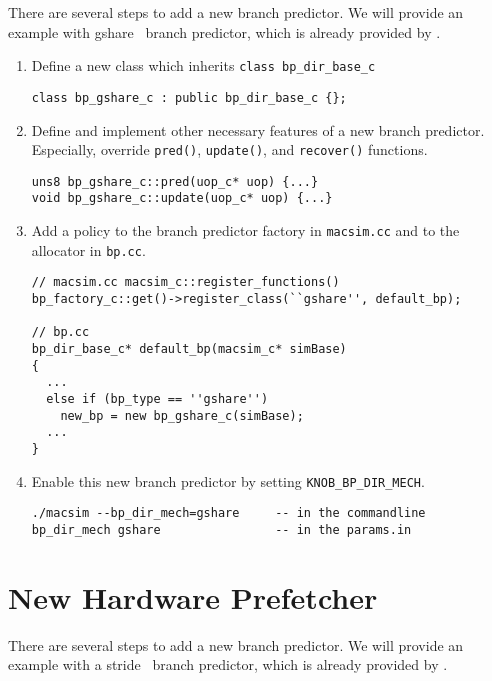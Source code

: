 There are several steps to add a new branch predictor. We will provide
an example with gshare~\cite{mcf93} branch predictor, which is already
provided by \SIM.

\begin{enumerate}
  \item Define a new class which inherits \Verb+class bp_dir_base_c+
\begin{Verbatim}
class bp_gshare_c : public bp_dir_base_c {};
\end{Verbatim}

  \item Define and implement other necessary features of a new branch
    predictor. Especially, override \Verb+pred()+, \Verb+update()+,
    and \Verb+recover()+ functions.
\begin{Verbatim}
uns8 bp_gshare_c::pred(uop_c* uop) {...}
void bp_gshare_c::update(uop_c* uop) {...}

\end{Verbatim}

  \item Add a policy to the branch predictor factory in
    \Verb+macsim.cc+ and to the allocator in \Verb+bp.cc+.

\begin{Verbatim}
// macsim.cc macsim_c::register_functions()
bp_factory_c::get()->register_class(``gshare'', default_bp);

// bp.cc
bp_dir_base_c* default_bp(macsim_c* simBase)
{
  ...
  else if (bp_type == ''gshare'')
    new_bp = new bp_gshare_c(simBase);
  ...
}
\end{Verbatim}

  \item Enable this new branch predictor by setting \Verb+KNOB_BP_DIR_MECH+.
\begin{Verbatim}
./macsim --bp_dir_mech=gshare     -- in the commandline
bp_dir_mech gshare                -- in the params.in
\end{Verbatim}
\end{enumerate}


\section{New Hardware Prefetcher}

There are several steps to add a new branch predictor. We will provide
an example with a stride~\cite{iac:spr04} branch predictor, which is already
provided by \SIM.

